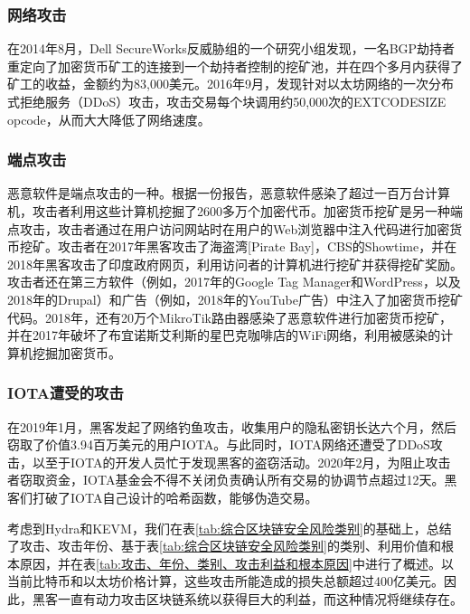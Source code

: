 \begin{translation}
\subsubsection{网络攻击}
在2014年8月，Dell SecureWorks反威胁组的一个研究小组发现，一名BGP劫持者重定向了加密货币矿工的连接到一个劫持者控制的挖矿池，并在四个多月内获得了矿工的收益，金额约为83,000美元\cite{art73}。2016年9月，发现针对以太坊网络的一次分布式拒绝服务（DDoS）攻击，攻击交易每个块调用约50,000次的EXTCODESIZE opcode，从而大大降低了网络速度\cite{art74}。

\subsubsection{端点攻击}
恶意软件是端点攻击的一种。根据一份报告，恶意软件感染了超过一百万台计算机，攻击者利用这些计算机挖掘了2600多万个加密代币\cite{art75}。加密货币挖矿是另一种端点攻击，攻击者通过在用户访问网站时在用户的Web浏览器中注入代码进行加密货币挖矿。攻击者在2017年黑客攻击了海盗湾[Pirate Bay]\cite{art76}，CBS的Showtime\cite{art77}，并在2018年黑客攻击了印度政府网页\cite{art78}，利用访问者的计算机进行挖矿并获得挖矿奖励。攻击者还在第三方软件（例如，2017年的Google Tag Manager\cite{art79}和WordPress\cite{art80}，以及2018年的Drupal\cite{art81}）和广告（例如，2018年的YouTube广告\cite{art82}）中注入了加密货币挖矿代码。2018年，还有20万个MikroTik路由器感染了恶意软件进行加密货币挖矿\cite{art83}，并在2017年破坏了布宜诺斯艾利斯的星巴克咖啡店的WiFi网络\cite{art84}，利用被感染的计算机挖掘加密货币。

\subsubsection{IOTA遭受的攻击}
在2019年1月，黑客发起了网络钓鱼攻击，收集用户的隐私密钥长达六个月，然后窃取了价值3.94百万美元的用户IOTA\cite{art85}。与此同时，IOTA网络还遭受了DDoS攻击，以至于IOTA的开发人员忙于发现黑客的盗窃活动\cite{art85}。2020年2月，为阻止攻击者窃取资金，IOTA基金会不得不关闭负责确认所有交易的协调节点超过12天。黑客们打破了IOTA自己设计的哈希函数，能够伪造交易\cite{art86}。

考虑到Hydra\cite{art87}和KEVM\cite{art88}，我们在表\ref{tab:综合区块链安全风险类别}的基础上，总结了攻击、攻击年份、基于表\ref{tab:综合区块链安全风险类别}的类别、利用价值和根本原因，并在表\ref{tab:攻击、年份、类别、攻击利益和根本原因}中进行了概述。以当前比特币和以太坊价格计算，这些攻击所能造成的损失总额超过400亿美元。因此，黑客一直有动力攻击区块链系统以获得巨大的利益，而这种情况将继续存在。


\end{translation}
